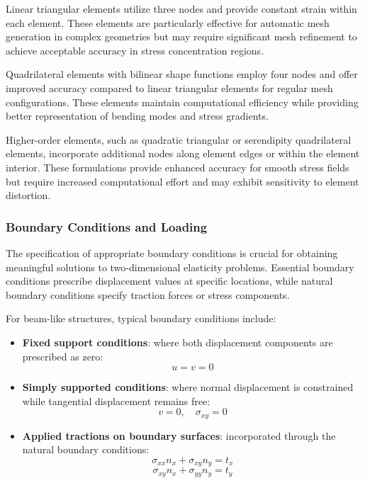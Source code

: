 \documentclass[12pt,a4paper]{report}
\begin{document}
Linear triangular elements utilize three nodes and provide constant strain within each element. These elements are particularly effective for automatic mesh generation in complex geometries but may require significant mesh refinement to achieve acceptable accuracy in stress concentration regions.

Quadrilateral elements with bilinear shape functions employ four nodes and offer improved accuracy compared to linear triangular elements for regular mesh configurations. These elements maintain computational efficiency while providing better representation of bending modes and stress gradients.

Higher-order elements, such as quadratic triangular or serendipity quadrilateral elements, incorporate additional nodes along element edges or within the element interior. These formulations provide enhanced accuracy for smooth stress fields but require increased computational effort and may exhibit sensitivity to element distortion.

\subsubsection{Boundary Conditions and Loading}

The specification of appropriate boundary conditions is crucial for obtaining meaningful solutions to two-dimensional elasticity problems. Essential boundary conditions prescribe displacement values at specific locations, while natural boundary conditions specify traction forces or stress components.

For beam-like structures, typical boundary conditions include:

\begin{itemize}
    \item \textbf{Fixed support conditions}: where both displacement components are prescribed as zero:
    \[
    u = v = 0
    \]

    \item \textbf{Simply supported conditions}: where normal displacement is constrained while tangential displacement remains free:
    \[
    v = 0, \quad \sigma_{xy} = 0
    \]

    \item \textbf{Applied tractions on boundary surfaces}: incorporated through the natural boundary conditions:
    \[
    \sigma_{xx} n_x + \sigma_{xy} n_y = t_x
    \]
    \[
    \sigma_{xy} n_x + \sigma_{yy} n_y = t_y
    \]
\end{itemize}
\end{document}

